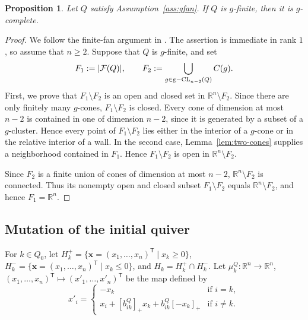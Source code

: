 \documentclass[11pt,reqno]{amsart}
\numberwithin{equation}{section}
\theoremstyle{definition}
\theoremstyle{plain}
\newtheorem{proposition}[example]{Proposition}
\DeclareMathOperator{\gseed}{{\rm g-CL}}
\begin{document}
	\begin{proposition}\label{prop:gfin-gcomp}
		Let $Q$ satisfy Assumption~\ref{ass:gfan}. If $Q$ is $g$-finite, then it is $g$-complete.
	\end{proposition}
	
	\begin{proof}
		We follow the finite-fan argument in \cite[Proposition~4.8]{A21}. The assertion is immediate in rank $1$, so assume that $n\geq2$. Suppose that $Q$ is $g$-finite, and set
		\[
		F_1:=|\mathcal F(Q)|,
		\qquad
		F_2:=\bigcup_{g\in\gseed_{n-2}(Q)}C(g).
		\]
		First, we prove that $F_1 \setminus F_2$ is an open and closed set in $\mathbb{R}^n \setminus F_2$. Since there are only finitely many $g$-cones, $F_1 \setminus F_2$ is closed. Every cone of dimension at most $n-2$ is contained in one of dimension $n-2$, since it is generated by a subset of a $g$-cluster. Hence every point of $F_1\setminus F_2$ lies either in the interior of a $g$-cone or in the relative interior of a wall. In the second case, Lemma~\ref{lem:two-cones} supplies a neighborhood contained in $F_1$. Hence $F_1 \setminus F_2$ is open in $\mathbb R^n\setminus F_2$.
		
		Since $F_2$ is a finite union of cones of dimension at most $n-2$, $\mathbb R^{n}\setminus F_2$ is connected. Thus its nonempty open and closed subset $F_1\setminus F_2$ equals $\mathbb R^{n}\setminus F_2$, and hence $F_1=\mathbb R^n$.
	\end{proof}

\subsection{Mutation of the initial quiver}
  For $k\in Q_0$, let $H_k^{+} = \{\mathbf{x} = (x_1,\dots,x_n)^{\mathsf T} \mid x_k \geq 0\}$, $H_k^{-} = \{\mathbf{x} = (x_1,\dots,x_n)^{\mathsf T} \mid x_k \leq 0\}$, and $H_k = H_k^+ \cap H_k^{-}$. Let $\mu_k^Q:\mathbb R^{n}\to\mathbb R^{n}$, $(x_1,\dots,x_n)^{\mathsf T} \mapsto (x'_1,\dots,x'_n)^{\mathsf T}$ be the map defined by
  \begin{equation}\label{eq:initial-mutation}
    x'_i=
    \begin{cases}
      -x_k & \text{if $i=k$},\\
      x_i+[b_{ik}^Q]_+x_k+b_{ik}^Q[-x_k]_{+}
      & \text{if $i\neq k$}.
    \end{cases}
  \end{equation}
\end{document}
